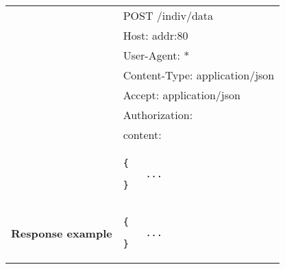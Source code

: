 \begin{adjustwidth}{1cm}{}
\begin{longtable}{|c|l|}
             & POST /indiv/data \\
             & Host: addr:80\\
             & User-Agent: * \\
             & Content-Type: application/json\\
             & Accept: application/json\\
             & Authorization: \\
             & content: \\
            & \begin{minipage}[t]{0.5\textwidth}
                \begin{adjustwidth}{1.5cm}{}
                \begin{verbatim}
{
    ...
}
                \end{verbatim}
                \end{adjustwidth}
              \end{minipage} \\
            \hline
             \textbf{Response example} & 
              \begin{minipage}[t]{0.5\textwidth}
                \begin{adjustwidth}{1.5cm}{}
                \begin{verbatim}
{
    ...
}
                \end{verbatim}
                \end{adjustwidth}
              \end{minipage} \\
              \hline
 
        \end{longtable}
    \end{adjustwidth}
    
